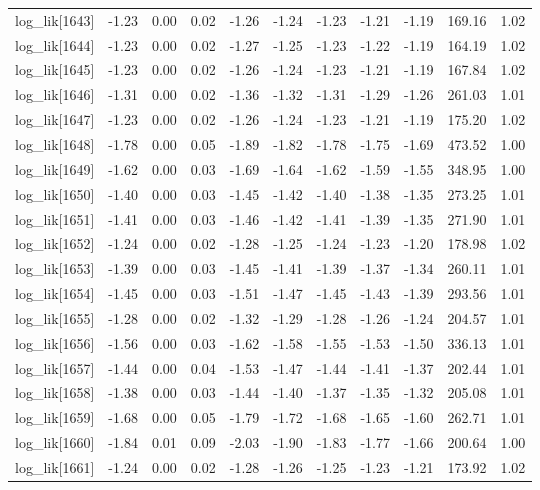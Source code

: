 \begin{table}[ht]
\begin{tabular}{rrrrrrrrrrr}
  log\_lik[1643] & -1.23 & 0.00 & 0.02 & -1.26 & -1.24 & -1.23 & -1.21 & -1.19 & 169.16 & 1.02 \\ 
  log\_lik[1644] & -1.23 & 0.00 & 0.02 & -1.27 & -1.25 & -1.23 & -1.22 & -1.19 & 164.19 & 1.02 \\ 
  log\_lik[1645] & -1.23 & 0.00 & 0.02 & -1.26 & -1.24 & -1.23 & -1.21 & -1.19 & 167.84 & 1.02 \\ 
  log\_lik[1646] & -1.31 & 0.00 & 0.02 & -1.36 & -1.32 & -1.31 & -1.29 & -1.26 & 261.03 & 1.01 \\ 
  log\_lik[1647] & -1.23 & 0.00 & 0.02 & -1.26 & -1.24 & -1.23 & -1.21 & -1.19 & 175.20 & 1.02 \\ 
  log\_lik[1648] & -1.78 & 0.00 & 0.05 & -1.89 & -1.82 & -1.78 & -1.75 & -1.69 & 473.52 & 1.00 \\ 
  log\_lik[1649] & -1.62 & 0.00 & 0.03 & -1.69 & -1.64 & -1.62 & -1.59 & -1.55 & 348.95 & 1.00 \\ 
  log\_lik[1650] & -1.40 & 0.00 & 0.03 & -1.45 & -1.42 & -1.40 & -1.38 & -1.35 & 273.25 & 1.01 \\ 
  log\_lik[1651] & -1.41 & 0.00 & 0.03 & -1.46 & -1.42 & -1.41 & -1.39 & -1.35 & 271.90 & 1.01 \\ 
  log\_lik[1652] & -1.24 & 0.00 & 0.02 & -1.28 & -1.25 & -1.24 & -1.23 & -1.20 & 178.98 & 1.02 \\ 
  log\_lik[1653] & -1.39 & 0.00 & 0.03 & -1.45 & -1.41 & -1.39 & -1.37 & -1.34 & 260.11 & 1.01 \\ 
  log\_lik[1654] & -1.45 & 0.00 & 0.03 & -1.51 & -1.47 & -1.45 & -1.43 & -1.39 & 293.56 & 1.01 \\ 
  log\_lik[1655] & -1.28 & 0.00 & 0.02 & -1.32 & -1.29 & -1.28 & -1.26 & -1.24 & 204.57 & 1.01 \\ 
  log\_lik[1656] & -1.56 & 0.00 & 0.03 & -1.62 & -1.58 & -1.55 & -1.53 & -1.50 & 336.13 & 1.01 \\ 
  log\_lik[1657] & -1.44 & 0.00 & 0.04 & -1.53 & -1.47 & -1.44 & -1.41 & -1.37 & 202.44 & 1.01 \\ 
  log\_lik[1658] & -1.38 & 0.00 & 0.03 & -1.44 & -1.40 & -1.37 & -1.35 & -1.32 & 205.08 & 1.01 \\ 
  log\_lik[1659] & -1.68 & 0.00 & 0.05 & -1.79 & -1.72 & -1.68 & -1.65 & -1.60 & 262.71 & 1.01 \\ 
  log\_lik[1660] & -1.84 & 0.01 & 0.09 & -2.03 & -1.90 & -1.83 & -1.77 & -1.66 & 200.64 & 1.00 \\ 
  log\_lik[1661] & -1.24 & 0.00 & 0.02 & -1.28 & -1.26 & -1.25 & -1.23 & -1.21 & 173.92 & 1.02 \\ 

\end{tabular}
\end{table}
